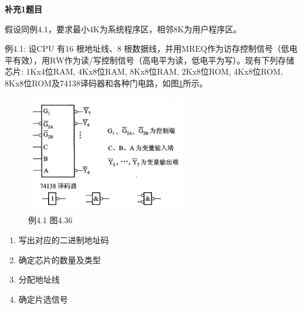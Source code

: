 \documentclass[UTF8]{report}
\newcommand{\mrm}[1]{\mathrm{#1}}
\newcommand{\problem}[1]{{\setlength{\parskip}{10pt}\noindent \bf{#1}}}
\begin{document}
\newpage

\problem{补充1题目}

假设同例4.1，要求最小4K为系统程序区，相邻8K为用户程序区。

例4.1: 设CPU 有16 根地址线、8 根数据线，并用$\overline{\mrm{MREQ}}$作为访存控制信号（低电平有效），用$\mrm{\overline{RW}}$作为读/写控制信号（高电平为读，低电平为写）。现有下列存储芯片: 1Kx4位RAM, 4Kx8位RAM, 8Kx8位RAM, 2Kx8位ROM, 4Kx8位ROM, 8Kx8位ROM及74138译码器和各种门电路，如图\ref{fig:book4_36}所示。

\begin{figure}[!htbp]
    \centering
    \includegraphics[width=7cm]{fig/book4.36.png}
    \caption{例4.1 图4.36}
    \label{fig:book4_36}
\end{figure}

\begin{enumerate}[label=(\arabic*)]
    \item 写出对应的二进制地址码
    \item 确定芯片的数量及类型
    \item 分配地址线
    \item 确定片选信号
\end{enumerate}
\end{document}
